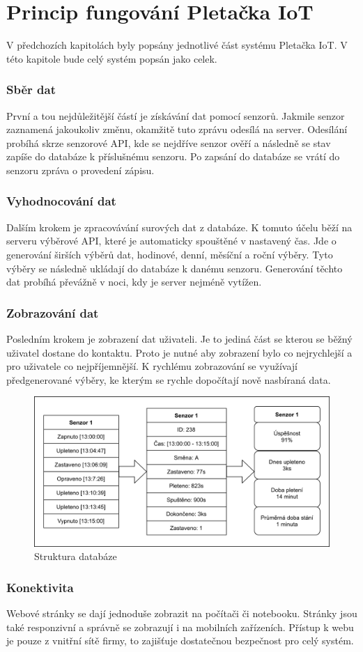 \chapter{Princip fungování Pletačka IoT}
V předchozích kapitolách byly popsány jednotlivé část systému Pletačka IoT.
V této kapitole bude celý systém popsán jako celek.


\subsection{Sběr dat}
První a tou nejdůležitější částí je získávání dat pomocí senzorů.
Jakmile senzor zaznamená jakoukoliv změnu, okamžitě tuto zprávu odesílá na server.
Odesílání probíhá skrze senzorové API, kde se nejdříve senzor ověří a následně se stav zapíše do databáze k příslušnému senzoru.
Po zapsání do databáze se vrátí do senzoru zpráva o provedení zápisu. 


\subsection{Vyhodnocování dat}
Dalším krokem je zpracovávání surových dat z databáze.
K tomuto účelu běží na serveru výběrové API, které je automaticky spouštěné v nastavený čas.
Jde o generování širších výběrů dat, hodinové, denní, měsíční a roční výběry.
Tyto výběry se následně ukládají do databáze k danému senzoru.
Generování těchto dat probíhá převážně v noci, kdy je server nejméně vytížen.


\subsection{Zobrazování dat}
Posledním krokem je zobrazení dat uživateli.
Je to jediná část se kterou se běžný uživatel dostane do kontaktu.
Proto je nutné aby zobrazení bylo co nejrychlejší a pro uživatele co nejpříjemnější.
K rychlému zobrazování se využívají předgenerované výběry, ke kterým se rychle dopočítají nově nasbíraná data.

\fxnote[author=JA]{\textcolor{mygreen}{schéma sběr - vyhodnocení - zobrazení}}

\begin{figure}[htbp]
    \centering
    \includegraphics[width=\textwidth]{img/Princip.png}
    \caption{Struktura databáze}
    \label{fig:databaze}
\end{figure}

\subsection{Konektivita}
Webové stránky se dají jednoduše zobrazit na počítači či notebooku.
Stránky jsou také responzivní a správně se zobrazují i na mobilních zařízeních.
Přístup k webu je pouze z vnitřní sítě firmy, to zajišťuje dostatečnou bezpečnost pro celý systém.


\newpage